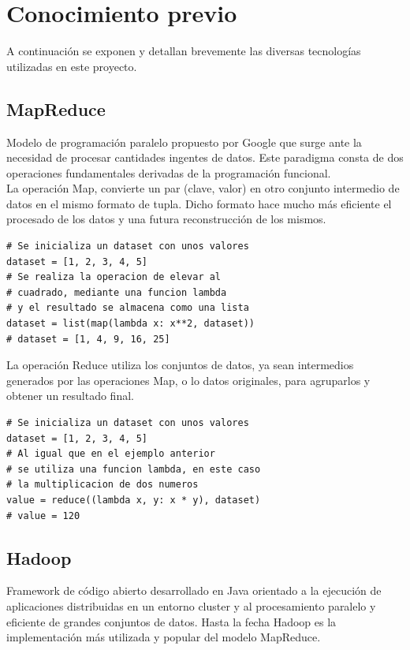 \documentclass[conference]{IEEEtran}
\begin{document}
\section{Conocimiento previo}

A continuación se exponen y detallan brevemente las diversas tecnologías utilizadas en este proyecto.

\subsection{MapReduce}
Modelo de programación paralelo propuesto por Google\cite{mapreduce} que surge ante la necesidad de procesar cantidades ingentes de datos. Este paradigma consta de dos operaciones fundamentales derivadas de la programación funcional.\\

La operación Map, convierte un par (clave, valor) en otro conjunto intermedio de datos en el mismo formato de tupla. Dicho formato hace mucho más eficiente el procesado de los datos y una futura reconstrucción de los mismos.\\

\begin{lstlisting}[style=pythonStyle, caption=Ejemplo de código Map]
# Se inicializa un dataset con unos valores
dataset = [1, 2, 3, 4, 5]
# Se realiza la operacion de elevar al 
# cuadrado, mediante una funcion lambda
# y el resultado se almacena como una lista
dataset = list(map(lambda x: x**2, dataset))
# dataset = [1, 4, 9, 16, 25]
\end{lstlisting}

La operación Reduce utiliza los conjuntos de datos, ya sean intermedios generados por las operaciones Map, o lo datos originales, para agruparlos y obtener un resultado final.

\begin{lstlisting}[style=pythonStyle, caption=Ejemplo de código Reduce]
# Se inicializa un dataset con unos valores
dataset = [1, 2, 3, 4, 5]
# Al igual que en el ejemplo anterior 
# se utiliza una funcion lambda, en este caso
# la multiplicacion de dos numeros
value = reduce((lambda x, y: x * y), dataset)
# value = 120
\end{lstlisting}

\subsection{Hadoop\cite{hadoop}}
Framework de código abierto desarrollado en Java orientado a la ejecución de aplicaciones distribuidas en un entorno cluster y al procesamiento paralelo y eficiente de grandes conjuntos de datos. Hasta la fecha Hadoop es la implementación más utilizada y popular del modelo MapReduce.
\end{document}
